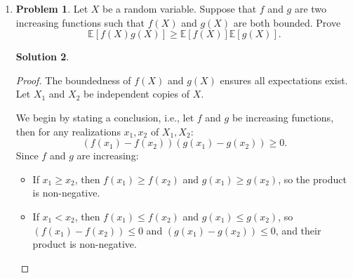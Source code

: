 \documentclass[12pt]{article}
\theoremstyle{definition}
\newtheorem*{solution}{\normalfont\textbf{Solution}}
\newtheorem*{Problem}{\noindent\textbf{Problem}}
\begin{document}
\begin{enumerate}[leftmargin=*]
\begin{solution}
\begin{proof}
                Now, specialize to the interval \([0, 1]\) by setting \(x_1 = 0\) and \(x_2 = 1\). The general inequality becomes:
                \[
                f\left( \frac{0 + 1}{2} \right) \leq \frac{1}{1 - 0} \int_{0}^{1} f(x)  dx \leq \frac{1}{2} \left[ f(0) + f(1) \right].
                \]
                Simplifying:
                \[
                f\left( \frac{1}{2} \right) \leq \int_{0}^{1} f(x)  dx \leq \frac{1}{2} \left[ f(0) + f(1) \right].
                \]
                This is the desired inequality for \([0, 1]\).
            \end{proof}
        \end{solution}

    \item \begin{Problem}
            Let \( X \) be a random variable. Suppose that \( f \) and \( g \) are two increasing functions such that \( f(X) \) and \( g(X) \) are both bounded. Prove
            \[
            \mathbb{E}[f(X)g(X)] \geq \mathbb{E}[f(X)]\mathbb{E}[g(X)].
            \]
        \end{Problem}
        \begin{solution}
            \begin{proof}
                The boundedness of \( f(X) \) and \( g(X) \) ensures all expectations exist. Let \( X_1 \) and \( X_2 \) be independent copies of \( X \).

                We begin by stating a conclusion, i.e., let \( f \) and \( g \) be increasing functions, then for any realizations \( x_1, x_2 \) of \( X_1, X_2 \):
                \[
                (f(x_1) - f(x_2))(g(x_1) - g(x_2)) \geq 0.
                \]
                Since \( f \) and \( g \) are increasing:
                \begin{itemize}
                \item If \( x_1 \geq x_2 \), then \( f(x_1) \geq f(x_2) \) and \( g(x_1) \geq g(x_2) \), so the product is non-negative.
                \item If \( x_1 < x_2 \), then \( f(x_1) \leq f(x_2) \) and \( g(x_1) \leq g(x_2) \), so \( (f(x_1)-f(x_2)) \leq 0 \) and \( (g(x_1)-g(x_2)) \leq 0 \), and their product is non-negative.
                \end{itemize}


\end{proof}
\end{solution}
\end{enumerate}
\end{document}

